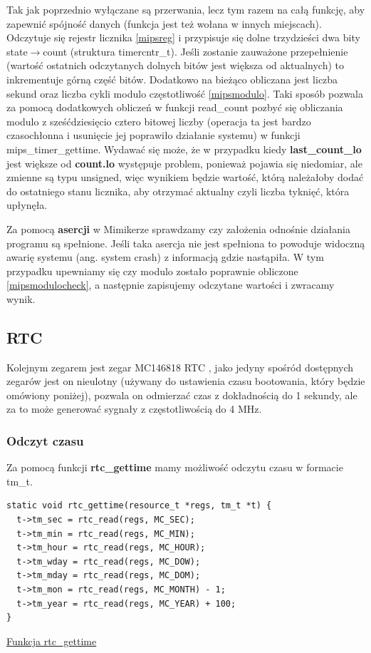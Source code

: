\documentclass[shortabstract]{iithesis}
\theoremstyle{definition} \newtheorem*{definition}{Definicja}
\theoremstyle{definition} \newtheorem*{example}{Przykład}
\theoremstyle{definition} \newtheorem*{remark}{Uwaga}
\newenvironment{longlisting}{\captionsetup{type=listing}}{}
\begin{document}
Tak jak poprzednio wyłączane są przerwania, lecz tym razem na całą funkcję, aby zapewnić spójność danych (funkcja jest też wołana w innych miejscach). Odczytuje się rejestr licznika \ref{mipsreg} i przypisuje się dolne trzydzieści dwa bity state$\rightarrow$count (struktura timercntr\_t). Jeśli zostanie zauważone przepełnienie (wartość ostatnich odczytanych dolnych bitów jest większa od aktualnych) to inkrementuje górną część bitów. Dodatkowo na bieżąco obliczana jest liczba sekund oraz liczba cykli modulo częstotliwość \ref{mipsmodulo}. Taki sposób pozwala za pomocą dodatkowych obliczeń w funkcji read\_count pozbyć się obliczania modulo z sześćdziesięcio cztero bitowej liczby (operacja ta jest bardzo czasochłonna i usunięcie jej poprawiło działanie systemu) w funkcji mips\_timer\_gettime. Wydawać się może, że w przypadku kiedy \textbf{last\_count\_lo} jest większe od \textbf{count.lo} występuje problem, ponieważ pojawia się niedomiar, ale zmienne są typu unsigned, więc wynikiem będzie wartość, którą należałoby dodać do ostatniego stanu licznika, aby otrzymać aktualny czyli liczba tyknięć, która upłynęła.

Za pomocą \textbf{asercji} w Mimikerze sprawdzamy czy założenia odnośnie działania programu są spełnione. Jeśli taka asercja nie jest spełniona to powoduje widoczną awarię systemu (ang. system crash) z informacją gdzie nastąpiła. W tym przypadku upewniamy się czy modulo zostało poprawnie obliczone \ref{mipsmodulocheck}, a następnie zapisujemy odczytane wartości i zwracamy wynik.

\subsection{RTC}
Kolejnym zegarem jest zegar MC146818 RTC \cite{bib:rtc}, jako jedyny spośród dostępnych zegarów jest on nieulotny (używany do ustawienia czasu bootowania, który będzie omówiony poniżej), pozwala on odmierzać czas z dokładnością do 1 sekundy, ale za to może generować sygnały z częstotliwością do 4 MHz.

\subsubsection{Odczyt czasu}
Za pomocą funkcji \textbf{rtc\_gettime} mamy możliwość odczytu czasu w formacie tm\_t.
\begin{longlisting}
  \begin{verbatim}
static void rtc_gettime(resource_t *regs, tm_t *t) {
  t->tm_sec = rtc_read(regs, MC_SEC);
  t->tm_min = rtc_read(regs, MC_MIN);
  t->tm_hour = rtc_read(regs, MC_HOUR);
  t->tm_wday = rtc_read(regs, MC_DOW);
  t->tm_mday = rtc_read(regs, MC_DOM);
  t->tm_mon = rtc_read(regs, MC_MONTH) - 1;
  t->tm_year = rtc_read(regs, MC_YEAR) + 100;
}
  \end{verbatim}
  \caption{\href{https://mimiker.ii.uni.wroc.pl/source/xref/mimiker/sys/drv/rtc.c?r=825ac182\#57}{Funkcja rtc\_gettime}}
  \label{lst:funcrtcgettime}
\end{longlisting}
\end{document}
